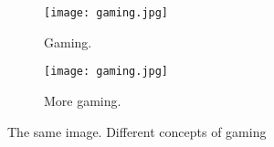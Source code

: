 \documentclass{article}
\begin{document}
	\begin{figure}[h!]
		\centering
		\begin{subfigure}[b]{0.4\linewidth}
			
			\texttt{[image: gaming.jpg]}
			\caption{Gaming.}
			\end{subfigure}
		\begin{subfigure}[b]{0.4\linewidth}
			
			\texttt{[image: gaming.jpg]}
			\caption{More gaming.}
		\end{subfigure}
	\caption{The same image. Different concepts of gaming}
		\label{fig:gaming}
		\end{figure}
\end{document}
